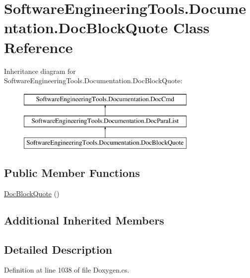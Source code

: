 \hypertarget{class_software_engineering_tools_1_1_documentation_1_1_doc_block_quote}{\section{Software\+Engineering\+Tools.\+Documentation.\+Doc\+Block\+Quote Class Reference}
\label{class_software_engineering_tools_1_1_documentation_1_1_doc_block_quote}
}
Inheritance diagram for Software\+Engineering\+Tools.\+Documentation.\+Doc\+Block\+Quote\+:\begin{figure}[H]
\begin{center}
\leavevmode
\includegraphics[height=3.000000cm]{class_software_engineering_tools_1_1_documentation_1_1_doc_block_quote}
\end{center}
\end{figure}
\subsection*{Public Member Functions}
\begin{DoxyCompactItemize}
\item 
\hyperlink{class_software_engineering_tools_1_1_documentation_1_1_doc_block_quote_ac44ac51db0231efd5242390f082416de}{Doc\+Block\+Quote} ()
\end{DoxyCompactItemize}
\subsection*{Additional Inherited Members}


\subsection{Detailed Description}


Definition at line 1038 of file Doxygen.\+cs.



